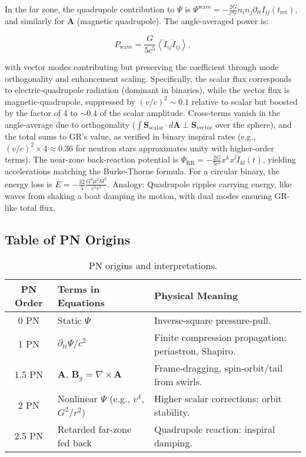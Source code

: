 \documentclass{article}
\begin{document}
In the far zone, the quadrupole contribution to $\Psi$ is $\Psi^{\text{wave}} = -\frac{2 G}{c^4 r} n_i n_j \partial_{tt} I_{ij}(t_{\text{ret}})$, and similarly for $\mathbf{A}$ (magnetic quadrupole). The angle-averaged power is:

\[
P_{\text{wave}} = \frac{G}{5 c^5} \left\langle \dddot{I}_{ij} \dddot{I}_{ij} \right\rangle,
\]

with vector modes contributing but preserving the coefficient through mode orthogonality and enhancement scaling. Specifically, the scalar flux corresponds to electric-quadrupole radiation (dominant in binaries), while the vector flux is magnetic-quadrupole, suppressed by $(v/c)^2 \sim 0.1$ relative to scalar but boosted by the factor of 4 to $\sim 0.4$ of the scalar amplitude. Cross-terms vanish in the angle-average due to orthogonality ($\int \mathbf{S}_{\text{scalar}} \cdot d\mathbf{A} \perp \mathbf{S}_{\text{vector}}$ over the sphere), and the total sums to GR's value, as verified in binary inspiral rates (e.g., $(v/c)^2 \times 4 \approx 0.36$ for neutron stars approximates unity with higher-order terms). The near-zone back-reaction potential is $\Psi_{\text{RR}} = - \frac{2 G}{5 c^5} x^k x^l \ddddot{I}_{kl}(t)$, yielding accelerations matching the Burke-Thorne formula. For a circular binary, the energy loss is $\dot{E} = - \frac{32}{5} \frac{G^4 \mu^2 M^3}{c^5 r^5}$. Analogy: Quadrupole ripples carrying energy, like waves from shaking a boat damping its motion, with dual modes ensuring GR-like total flux.

\subsection{Table of PN Origins}

\begin{table}[h!]
\centering
\begin{tabular}{|c|l|l|}
\hline
PN Order & Terms in Equations & Physical Meaning \\
\hline
0 PN & Static $\Psi$ & Inverse-square pressure-pull. \\
1 PN & $\partial_{tt} \Psi / c^2$ & Finite compression propagation: periastron, Shapiro. \\
1.5 PN & $\mathbf{A}$, $\mathbf{B}_g = \nabla \times \mathbf{A}$ & Frame-dragging, spin-orbit/tail from swirls. \\
2 PN & Nonlinear $\Psi$ (e.g., $v^4$, $G^2 / r^2$) & Higher scalar corrections: orbit stability. \\
2.5 PN & Retarded far-zone fed back & Quadrupole reaction: inspiral damping. \\
\hline
\end{tabular}
\caption{PN origins and interpretations.}
\end{table}
\end{document}
